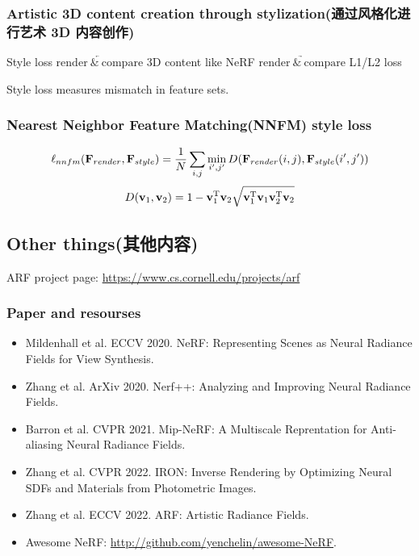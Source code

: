 \documentclass[cn,hazy,blue,14pt,screen]{elegantnote}
\begin{document}
\subsubsection{Artistic 3D content creation through stylization(通过风格化进行艺术 3D 内容创作)}

Style loss $\underleftarrow{\mathrm{render\ \&\ compare}}$ 3D content like NeRF $\underrightarrow{\mathrm{render\ \&\ compare}}$ L1/L2 loss

Style loss measures mismatch in feature sets.

\subsubsection{Nearest Neighbor Feature Matching(NNFM) style loss}

\[\ell_{nnfm}(\bold{F}_{render},\bold{F}_{style})=\dfrac{1}{N}\sum_{i,j}\min_{i',j'}D(\bold{F}_{render}(i,j),\bold{F}_{style}(i',j'))\]
\[D(\bold{v}_1,\bold{v}_2)=1-\bold{v}_1^{\mathrm{T}}\bold{v}_2\sqrt{\bold{v}_1^{\mathrm{T}}\bold{v}_1\bold{v}_2^{\mathrm{T}}\bold{v}_2}\]

\subsection{Other things(其他内容)}

ARF project page: \href{https://www.cs.cornell.edu/projects/arf}{https://www.cs.cornell.edu/projects/arf}

\subsubsection{Paper and resourses}

\begin{itemize}
\item Mildenhall et al. ECCV 2020. NeRF: Representing Scenes as Neural Radiance Fields for View Synthesis.
\item Zhang et al. ArXiv 2020. Nerf++: Analyzing and Improving Neural Radiance Fields.
\item Barron et al. CVPR 2021. Mip-NeRF: A Multiscale Reprentation for Anti-aliasing Neural Radiance Fields.
\item Zhang et al. CVPR 2022. IRON: Inverse Rendering by Optimizing Neural SDFs and Materials from Photometric Images.
\item Zhang et al. ECCV 2022. ARF: Artistic Radiance Fields.
\item Awesome NeRF: \href{http://github.com/yenchelin/awesome-NeRF}{http://github.com/yenchelin/awesome-NeRF}.
\end{itemize}



\end{document}

